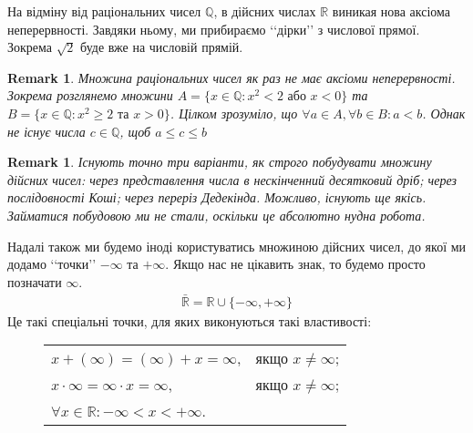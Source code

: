\documentclass[a4paper, 14pt]{article}
\theoremstyle{theoremdd}
\theoremstyle{theoremdd}
\theoremstyle{theoremdd}
\theoremstyle{theoremdd}
\theoremstyle{theoremdd}
\theoremstyle{theoremdd}
\newtheorem{remark}[theorem]{Remark}
\theoremstyle{theoremdd}
\theoremstyle{theoremdd}
\begin{document}
	На відміну від раціональних чисел $\mathbb{Q}$, в дійсних числах $\mathbb{R}$ виникая нова аксіома неперервності. Завдяки ньому, ми прибираємо \lq\lq дірки\rq\rq \text{} з числової прямої. Зокрема $\sqrt{2}$ буде вже на числовій прямій.
	
	\begin{remark}
	Множина раціональних чисел як раз не має аксіоми неперервності. Зокрема розглянемо множини $A = \{x \in \mathbb{Q}: x^2 < 2 \text{ або } x < 0\}$ та $B = \{x \in \mathbb{Q}: x^2 \geq 2 \text{ та } x > 0\}$. Цілком зрозуміло, що $\forall a \in A, \forall b \in B: a < b$. Однак не існує числа $c \in \mathbb{Q}$, щоб $a \leq c \leq b$
	\end{remark}
	
	\begin{remark}
	Існують точно три варіанти, як строго побудувати множину дійсних чисел: через представлення числа в нескінченний десятковий дріб; через послідовності Коші; через переріз Дедекінда. Можливо, існують ще якісь. Займатися побудовою ми не стали, оскільки це абсолютно нудна робота.
	\end{remark}
	
	Надалі також ми будемо іноді користуватись множиною дійсних чисел, до якої ми додамо \lq\lq точки\rq\rq \text{} $-\infty$ та $+\infty$. Якщо нас не цікавить знак, то будемо просто позначати $\infty$.
	\begin{align*}
	\bar{\mathbb{R}} = \mathbb{R} \cup \{-\infty, +\infty\}
	\end{align*}
	Це такі спеціальні точки, для яких виконуються такі властивості:
	\begin{figure}[H]
	\centering
	\begin{tabular}{ll}
	$x + (\infty) = (\infty) + x = \infty$, & якщо $x \neq \infty$;\\
	$x \cdot \infty = \infty \cdot x = \infty$, & якщо $x \neq \infty$;\\
	$\forall x \in \mathbb{R}: -\infty < x < +\infty$. &
	\end{tabular}
	\end{figure}
\end{document}
